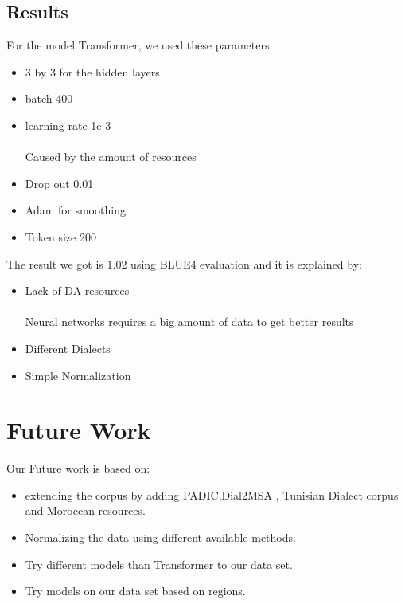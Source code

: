 \documentclass[paper=a4, fontsize=11pt]{scrartcl}
\numberwithin{equation}{section}		%
\numberwithin{figure}{section}			%
\numberwithin{table}{section}				%
\begin{document}
\subsection{Results}
For the model Transformer, we used these parameters: \\
\begin{itemize}
    \item 3 by 3 for the hidden layers
    \item batch 400 
    \item learning rate 1e-3 \\
    \paragraph{}
    Caused by the amount of resources
    \item Drop out 0.01
    \item Adam for smoothing
    \item Token size 200
\end{itemize}
The result we got is 1.02 using BLUE4 evaluation and it is explained by:
\begin{itemize}
    \item Lack of DA resources 
    \paragraph{}
    Neural networks requires a big amount of data to get better results
    \item Different Dialects
    \item Simple Normalization
\end{itemize}

\section{Future Work}
Our Future work is based on:
\begin{itemize}
    \item extending the corpus by adding PADIC\cite{meftouh2015machine},Dial2MSA \cite{mubarak2018dial2msa} , Tunisian Dialect corpus  and Moroccan resources.
    \item Normalizing the data using different available methods.
    \item Try different models than Transformer to our data set.
    \item Try models on our data set based on regions.
\end{itemize}
  
\end{document}
